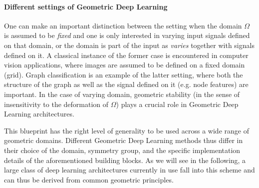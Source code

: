 


\paragraph{Different settings of Geometric Deep Learning}
One can make an important distinction between the setting when the domain $\Omega$ is assumed to be {\em fixed} and one is only interested in varying input signals defined on that domain, or the domain is part of the input as {\em varies} together with signals defined on it. 
%
A classical instance of the former case is encountered in computer vision applications, where images are assumed to be defined on a fixed domain (grid). 
%
Graph classification is an example of the latter setting, where both the structure of the graph as well as the signal defined on it (e.g. node features) are important. 
%
In the case of varying domain, geometric stability (in the sense of insensitivity to the deformation of $\Omega$) plays a crucial role in Geometric Deep Learning architectures. 


This blueprint  has the right level of generality to be used across a wide range of geometric domains. 
Different Geometric Deep Learning methods thus differ in their choice of the domain, symmetry group, and the specific implementation details of the aforementioned building blocks. 
As we will see in the following, a large class of deep learning architectures currently in use fall into this scheme and can thus be derived from common geometric principles.  
%


